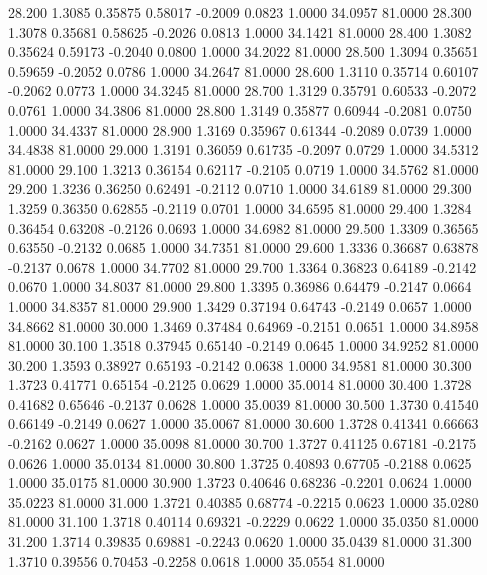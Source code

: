   28.200   1.3085   0.35875   0.58017  -0.2009   0.0823   1.0000  34.0957  81.0000
  28.300   1.3078   0.35681   0.58625  -0.2026   0.0813   1.0000  34.1421  81.0000
  28.400   1.3082   0.35624   0.59173  -0.2040   0.0800   1.0000  34.2022  81.0000
  28.500   1.3094   0.35651   0.59659  -0.2052   0.0786   1.0000  34.2647  81.0000
  28.600   1.3110   0.35714   0.60107  -0.2062   0.0773   1.0000  34.3245  81.0000
  28.700   1.3129   0.35791   0.60533  -0.2072   0.0761   1.0000  34.3806  81.0000
  28.800   1.3149   0.35877   0.60944  -0.2081   0.0750   1.0000  34.4337  81.0000
  28.900   1.3169   0.35967   0.61344  -0.2089   0.0739   1.0000  34.4838  81.0000
  29.000   1.3191   0.36059   0.61735  -0.2097   0.0729   1.0000  34.5312  81.0000
  29.100   1.3213   0.36154   0.62117  -0.2105   0.0719   1.0000  34.5762  81.0000
  29.200   1.3236   0.36250   0.62491  -0.2112   0.0710   1.0000  34.6189  81.0000
  29.300   1.3259   0.36350   0.62855  -0.2119   0.0701   1.0000  34.6595  81.0000
  29.400   1.3284   0.36454   0.63208  -0.2126   0.0693   1.0000  34.6982  81.0000
  29.500   1.3309   0.36565   0.63550  -0.2132   0.0685   1.0000  34.7351  81.0000
  29.600   1.3336   0.36687   0.63878  -0.2137   0.0678   1.0000  34.7702  81.0000
  29.700   1.3364   0.36823   0.64189  -0.2142   0.0670   1.0000  34.8037  81.0000
  29.800   1.3395   0.36986   0.64479  -0.2147   0.0664   1.0000  34.8357  81.0000
  29.900   1.3429   0.37194   0.64743  -0.2149   0.0657   1.0000  34.8662  81.0000
  30.000   1.3469   0.37484   0.64969  -0.2151   0.0651   1.0000  34.8958  81.0000
  30.100   1.3518   0.37945   0.65140  -0.2149   0.0645   1.0000  34.9252  81.0000
  30.200   1.3593   0.38927   0.65193  -0.2142   0.0638   1.0000  34.9581  81.0000
  30.300   1.3723   0.41771   0.65154  -0.2125   0.0629   1.0000  35.0014  81.0000
  30.400   1.3728   0.41682   0.65646  -0.2137   0.0628   1.0000  35.0039  81.0000
  30.500   1.3730   0.41540   0.66149  -0.2149   0.0627   1.0000  35.0067  81.0000
  30.600   1.3728   0.41341   0.66663  -0.2162   0.0627   1.0000  35.0098  81.0000
  30.700   1.3727   0.41125   0.67181  -0.2175   0.0626   1.0000  35.0134  81.0000
  30.800   1.3725   0.40893   0.67705  -0.2188   0.0625   1.0000  35.0175  81.0000
  30.900   1.3723   0.40646   0.68236  -0.2201   0.0624   1.0000  35.0223  81.0000
  31.000   1.3721   0.40385   0.68774  -0.2215   0.0623   1.0000  35.0280  81.0000
  31.100   1.3718   0.40114   0.69321  -0.2229   0.0622   1.0000  35.0350  81.0000
  31.200   1.3714   0.39835   0.69881  -0.2243   0.0620   1.0000  35.0439  81.0000
  31.300   1.3710   0.39556   0.70453  -0.2258   0.0618   1.0000  35.0554  81.0000
